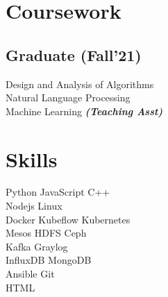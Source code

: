 \documentclass[]{deedy-resume-openfont}
\begin{document}
\begin{minipage}[t]{0.33\textwidth}
\section{Coursework}
\subsection{Graduate
(Fall'21)}
\textbullet{} Design and Analysis of Algorithms \\
\textbullet{} Natural Language Processing \\
\textbullet{} Machine Learning
{\footnotesize \textit{\textbf{(Teaching Asst) }}} 
\sectionsep


\section{Skills}
\textbullet{} Python \textbullet{} JavaScript \textbullet{} C++ \\
\textbullet{} Nodejs \textbullet{} Linux \\
\textbullet{} Docker
\textbullet{} Kubeflow
\textbullet{} Kubernetes \\
\textbullet{} Mesos
\textbullet{} HDFS
\textbullet{} Ceph \\
\textbullet{} Kafka
\textbullet{} Graylog \\
\textbullet{} InfluxDB
\textbullet{} MongoDB \\
\textbullet{} Ansible
\textbullet{} Git \\
\textbullet{} HTML 
\sectionsep

%
%

\end{minipage} 
\hfill
\end{document}
